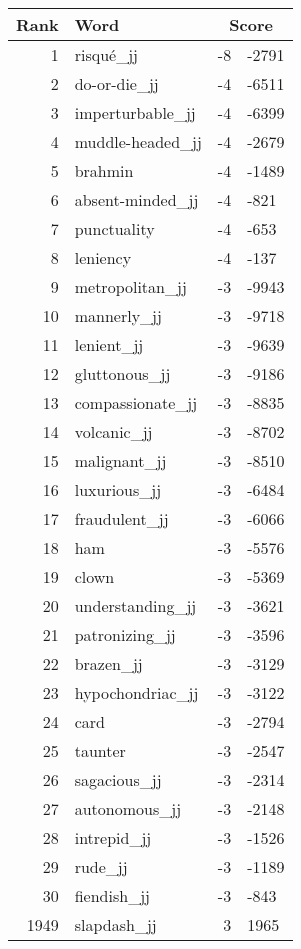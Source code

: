 \begin{longtable}[!htbp]{| rlr@{.}l |}
    \hline
    \textbf{Rank} & \textbf{Word} & \multicolumn{2}{c|}{\textbf{Score}} \\
    \hline
    \endhead
    1 & risqué\_jj & -8 & -2791 \\
    2 & do-or-die\_jj & -4 & -6511 \\
    3 & imperturbable\_jj & -4 & -6399 \\
    4 & muddle-headed\_jj & -4 & -2679 \\
    5 & brahmin & -4 & -1489 \\
    6 & absent-minded\_jj & -4 & -821 \\
    7 & punctuality & -4 & -653 \\
    8 & leniency & -4 & -137 \\
    9 & metropolitan\_jj & -3 & -9943 \\
    10 & mannerly\_jj & -3 & -9718 \\
    11 & lenient\_jj & -3 & -9639 \\
    12 & gluttonous\_jj & -3 & -9186 \\
    13 & compassionate\_jj & -3 & -8835 \\
    14 & volcanic\_jj & -3 & -8702 \\
    15 & malignant\_jj & -3 & -8510 \\
    16 & luxurious\_jj & -3 & -6484 \\
    17 & fraudulent\_jj & -3 & -6066 \\
    18 & ham & -3 & -5576 \\
    19 & clown & -3 & -5369 \\
    20 & understanding\_jj & -3 & -3621 \\
    21 & patronizing\_jj & -3 & -3596 \\
    22 & brazen\_jj & -3 & -3129 \\
    23 & hypochondriac\_jj & -3 & -3122 \\
    24 & card & -3 & -2794 \\
    25 & taunter & -3 & -2547 \\
    26 & sagacious\_jj & -3 & -2314 \\
    27 & autonomous\_jj & -3 & -2148 \\
    28 & intrepid\_jj & -3 & -1526 \\
    29 & rude\_jj & -3 & -1189 \\
    30 & fiendish\_jj & -3 & -843 \\
    1949 & slapdash\_jj & 3 & 1965 \\

\end{longtable}
